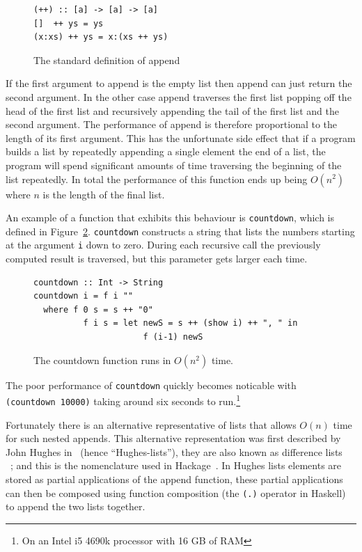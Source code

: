 \begin{figure}[t]
\begin{lstlisting}
(++) :: [a] -> [a] -> [a]
[]  ++ ys = ys
(x:xs) ++ ys = x:(xs ++ ys)
\end{lstlisting}
\caption{The standard definition of append}
\label{append}
\end{figure}

If the first argument to append is the empty list then append can just return the second argument. In the other case append traverses the first list popping off the head of the first list and recursively appending the tail of the first list and the second argument. The performance of append is therefore proportional to the length of its first argument. This has the unfortunate side effect that if a program builds a list by repeatedly appending a single element the end of a list, the program will spend significant amounts of time traversing the beginning of the list repeatedly. In total the performance of this function ends up being $O(n^2)$ where $n$ is the length of the final list.

An example of a function that exhibits this behaviour is \texttt{countdown}, which is defined in Figure~\ref{countdown}. \texttt{countdown} constructs a string that lists the numbers starting at the argument \texttt{i} down to zero. During each recursive call the previously computed result is traversed, but this parameter gets larger each time.

\begin{figure}[t]
\begin{lstlisting}
countdown :: Int -> String
countdown i = f i ""
  where f 0 s = s ++ "0"
          f i s = let newS = s ++ (show i) ++ ", " in
                      f (i-1) newS
\end{lstlisting}
\caption{The countdown function runs in $O(n^2)$ time.}
\label{countdown}
\end{figure}

The poor performance of \texttt{countdown} quickly becomes noticable with\\ \texttt{(countdown 10000)} taking around six seconds to run.\footnote{On an Intel i5 4690k processor with 16 GB of RAM}

Fortunately there is an alternative representative of lists that allows $O(n)$ time for such nested appends. This alternative representation was first described by John Hughes in~\citep{hughesList} (hence ``Hughes-lists''), they are also known as difference lists\\~\citep{realWorldHaskell}; and this is the nomenclature used in Hackage~\citep{dlist}. In Hughes lists elements are stored as partial applications of the append function, these partial applications can then be composed using function composition (the \texttt{(.)} operator in Haskell) to append the two lists together. 

